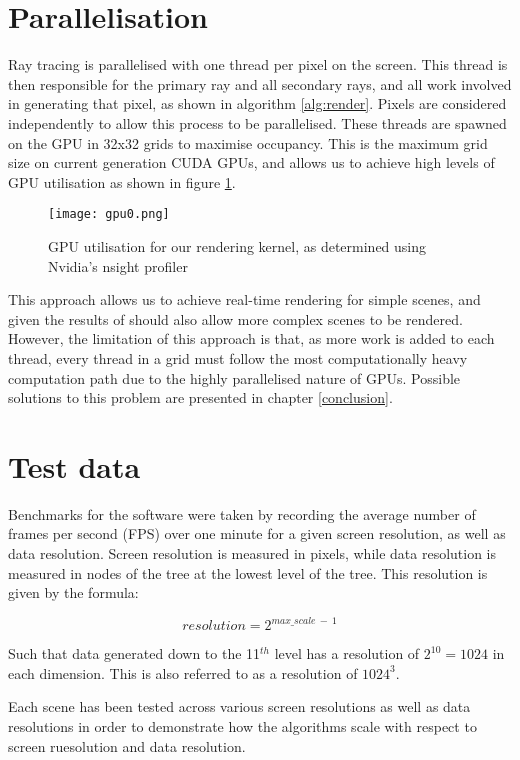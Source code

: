 \section{Parallelisation}
Ray tracing is parallelised with one thread per pixel on the screen. This thread is then responsible for the primary ray and all secondary rays, and all work involved in generating that pixel, as shown in algorithm \ref{alg:render}. Pixels are considered independently to allow this process to be parallelised. These threads are spawned on the GPU in 32x32 grids to maximise occupancy. This is the maximum grid size on current generation CUDA GPUs, and allows us to achieve high levels of GPU utilisation as shown in figure \ref{fig:utilisation}.

\begin{figure}
\centering
	\texttt{[image: gpu0.png]}
	\caption{GPU utilisation for our rendering kernel, as determined using Nvidia's nsight profiler}
	\label{fig:utilisation}
\end{figure}

This approach allows us to achieve real-time rendering for simple scenes, and given the results of \cite{laine10efficientsvos} should also allow more complex scenes to be rendered. However, the limitation of this approach is that, as more work is added to each thread, every thread in a grid must follow the most computationally heavy computation path due to the highly parallelised nature of GPUs. Possible solutions to this problem are presented in chapter \ref{conclusion}.

\section{Test data}
Benchmarks for the software were taken by recording the average number of frames per second (FPS) over one minute for a given screen resolution, as well as data resolution. Screen resolution is measured in pixels, while data resolution is measured in nodes of the tree at the lowest level of the tree. This resolution is given by the formula:

\[
	resolution = 2^{max\_scale~ -~ 1}
\]

Such that data generated down to the 11$^{th}$ level has a resolution of $2^{10} = 1024$ in each dimension. This is also referred to as a resolution of $1024^3$.

Each scene has been tested across various screen resolutions as well as data resolutions in order to demonstrate how the algorithms scale with respect to screen ruesolution and data resolution.

